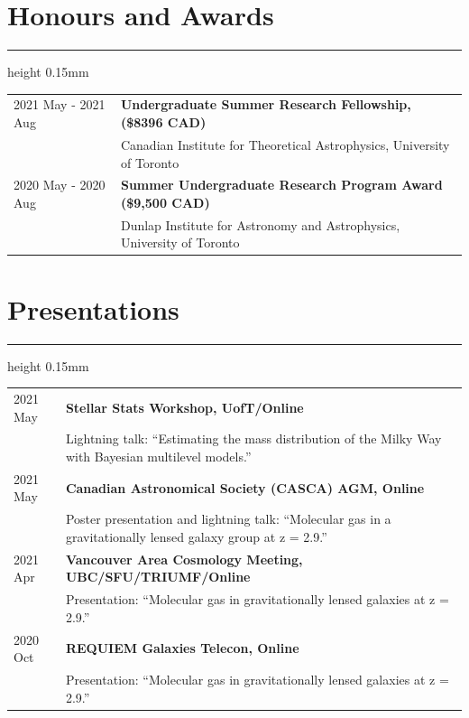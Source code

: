 \documentclass[10pt]{article}
\begin{document}
\vspace{-5mm}
\section*{Honours and Awards}
\vspace{-1.5mm}
\hrule height 0.15mm
\vspace{2mm}

\begin{tabularx}{\textwidth}{lX}
    2021 May - 2021 Aug & \textbf{Undergraduate Summer Research Fellowship, (\$8396 CAD)} \\
                        & Canadian Institute for Theoretical Astrophysics, University of Toronto \\
    2020 May - 2020 Aug & \textbf{Summer Undergraduate Research Program Award (\$9,500 CAD)} \\
                        & Dunlap Institute for Astronomy and Astrophysics, University of Toronto
\end{tabularx}


\vspace{-2mm}
\section*{Presentations}
\vspace{-1.5mm}
\hrule height 0.15mm
\vspace{2mm}

\begin{tabularx}{\textwidth}{lX}
    2021 May & \textbf{Stellar Stats Workshop, UofT/Online} \\
             & Lightning talk: ``Estimating the mass distribution of the Milky Way with Bayesian multilevel models.'' \\
    2021 May & \textbf{Canadian Astronomical Society (CASCA) AGM, Online} \\
             & Poster presentation and lightning talk: ``Molecular gas in a gravitationally lensed galaxy group at z = 2.9.'' \\
    2021 Apr & \textbf{Vancouver Area Cosmology Meeting, UBC/SFU/TRIUMF/Online} \\
             & Presentation: ``Molecular gas in gravitationally lensed galaxies at z = 2.9.'' \\
    2020 Oct & \textbf{REQUIEM Galaxies Telecon, Online} \\
             & Presentation: ``Molecular gas in gravitationally lensed galaxies at z = 2.9.''
\end{tabularx}
\end{document}
